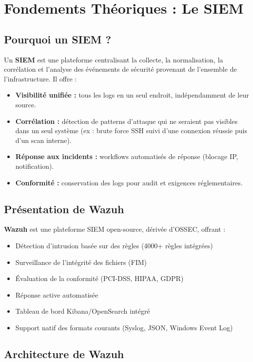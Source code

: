 \documentclass[12pt,a4paper,openany]{report}
\begin{document}
\section{Fondements Théoriques : Le SIEM}

\subsection{Pourquoi un SIEM ?}

Un \textbf{SIEM} est une plateforme centralisant la collecte, la normalisation, la corrélation et
l'analyse des événements de sécurité provenant de l'ensemble de l'infrastructure. Il offre :

\begin{itemize}
    \item \textbf{Visibilité unifiée :} tous les logs en un seul endroit, indépendamment de leur source.
    \item \textbf{Corrélation :} détection de patterns d'attaque qui ne seraient pas visibles
          dans un seul système (ex : brute force SSH suivi d'une connexion réussie puis d'un scan interne).
    \item \textbf{Réponse aux incidents :} workflows automatisés de réponse (blocage IP, notification).
    \item \textbf{Conformité :} conservation des logs pour audit et exigences réglementaires.
\end{itemize}

\subsection{Présentation de Wazuh}

\textbf{Wazuh} est une plateforme SIEM open-source, dérivée d'OSSEC, offrant :
\begin{itemize}
    \item Détection d'intrusion basée sur des règles (4000+ règles intégrées)
    \item Surveillance de l'intégrité des fichiers (FIM)
    \item Évaluation de la conformité (PCI-DSS, HIPAA, GDPR)
    \item Réponse active automatisée
    \item Tableau de bord Kibana/OpenSearch intégré
    \item Support natif des formats courants (Syslog, JSON, Windows Event Log)
\end{itemize}

\subsection{Architecture de Wazuh}
\end{document}
